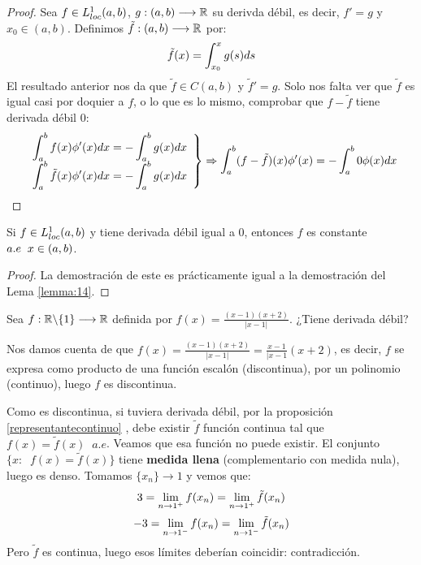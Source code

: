 \begin{proof}
Sea $f\in L^1_{loc}(a,b)$, $g : (a,b) \longrightarrow \mathbb{R}$ su derivda débil, es decir, $f'=g$ y $x_0\in(a,b)$. Definimos $\tilde{f} : (a,b) \longrightarrow \mathbb{R}$ por:
\[
\tilde{f}(x)=\displaystyle\int_{ x_0 }^{ x } g(s)ds
\]
El resultado anterior nos da que $\tilde{f}\in C(a,b)$ y $\tilde{f}'=g$. Solo nos falta ver que $\tilde{f}$ es igual casi por doquier a $f$, o lo que es lo mismo, comprobar que $f-\tilde{f}$ tiene derivada débil 0:
\[
\left.
\begin{array}{cc}
\displaystyle\int_{ a }^{ b } f(x)\phi'(x)dx=-\displaystyle\int_{ a }^{ b } g(x)dx \\
\displaystyle\int_{ a }^{ b } \tilde{f}(x)\phi'(x)dx=-\displaystyle\int_{ a }^{ b } g(x)dx
\end{array}
\right\} \Rightarrow \displaystyle\int_{ a }^{ b } (f-\tilde{f})(x)\phi'(x)=-\displaystyle\int_{ a }^{ b } 0\phi(x)dx
\]
\end{proof}

\begin{prop}
Si $f\in L^1_{loc}(a,b)$ y tiene derivada débil igual a 0, entonces $f$ es constante $a.e \;\; x\in(a,b)$.
\end{prop}

\begin{proof}
La demostración de este es prácticamente igual a la demostración del Lema \ref{lemma:14}.
\end{proof}

\begin{example}[examen 18/19]
Sea $f : \mathbb{R}\backslash\{1\} \longrightarrow \mathbb{R}$ definida por $f(x)=\frac{(x-1)(x+2)}{|x-1|}$. ¿Tiene derivada débil?

Nos damos cuenta de que $f(x)=\frac{(x-1)(x+2)}{|x-1|}=\frac{x-1}{|x-1}(x+2)$, es decir, $f$ se expresa como producto de una función escalón (discontinua), por un polinomio (continuo), luego $f$ es discontinua.

Como es discontinua, si tuviera derivada débil, por la proposición \ref{representantecontinuo} , debe existir $\tilde{f}$ función continua tal que $f(x)=\tilde{f}(x)\;\; a.e$. Veamos que esa función no puede existir. El conjunto $\{x:\;\; f(x)=\tilde{f}(x)\}$ tiene \textbf{medida llena} (complementario con medida nula), luego es denso. Tomamos $\{x_n\}\longrightarrow 1$ y vemos que:
\[
3=\displaystyle\lim_{ n \to 1^+ } f(x_n)=\displaystyle\lim_{ n \to 1^+ } \tilde{f}(x_n)
\]
\[
-3=\displaystyle\lim_{ n \to 1^- } f(x_n)=\displaystyle\lim_{ n \to 1^- } \tilde{f}(x_n)
\]
Pero $\tilde{f}$ es continua, luego esos límites deberían coincidir: contradicción.

\end{example}

